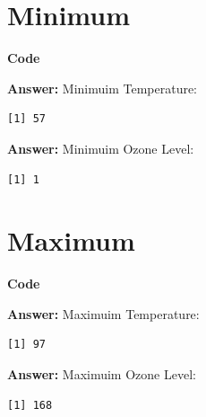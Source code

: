 \documentclass[
  letterpaper,
]{book}
\newenvironment{Shaded}{\begin{snugshade}}{\end{snugshade}}
\newcommand{\FunctionTok}[1]{\textcolor[rgb]{0.28,0.35,0.67}{#1}}
\newcommand{\NormalTok}[1]{\textcolor[rgb]{0.00,0.23,0.31}{#1}}
\newcommand{\OtherTok}[1]{\textcolor[rgb]{0.00,0.23,0.31}{#1}}
\newcommand{\SpecialCharTok}[1]{\textcolor[rgb]{0.37,0.37,0.37}{#1}}
\begin{document}
\section{Minimum}\label{minimum}

\textbf{Code}

\begin{Shaded}
\end{Shaded}

\textbf{Answer:} Minimuim Temperature:

\begin{verbatim}
[1] 57
\end{verbatim}

\textbf{Answer:} Minimuim Ozone Level:

\begin{verbatim}
[1] 1
\end{verbatim}

\section{Maximum}\label{maximum}

\textbf{Code}

\begin{Shaded}
\end{Shaded}

\textbf{Answer:} Maximuim Temperature:

\begin{verbatim}
[1] 97
\end{verbatim}

\textbf{Answer:} Maximuim Ozone Level:

\begin{verbatim}
[1] 168
\end{verbatim}

\end{document}
